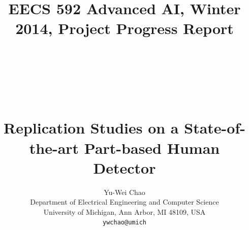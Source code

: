 \documentclass[10pt,twocolumn,letterpaper]{article}
\begin{document}
\title{{\vspace{-30mm}\small EECS 592 Advanced AI, Winter 2014, Project Progress Report} \\
~\\
~\\
~\\
~\\
Replication Studies on a State-of-the-art Part-based Human Detector}

\author{Yu-Wei Chao\\
Department of Electrical Engineering and Computer Science \\
University of Michigan, Ann Arbor, MI 48109, USA\\
{\tt\small ywchao@umich}
}

\maketitle


%
%
%
%
%
%
%
%
%
%
%
\end{document}
